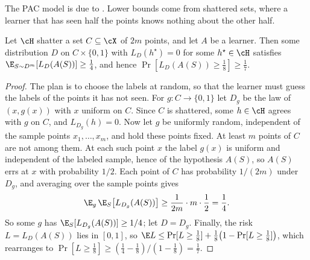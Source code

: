 \begin{refsection}

The PAC model is due to \textcite{Valiant1984}. Lower bounds come from shattered sets, where a learner that has seen half the points knows nothing about the other half.

\begin{theorem}\label{thm:vc:nfl}
Let $\cH$ shatter a set $C\subseteq\cX$ of $2m$ points, and let $A$ be a learner. Then some distribution $D$ on $C\times\{0,1\}$ with $L_D(h^\star) = 0$ for some $h^\star\in\cH$ satisfies $\E_{S\sim D^m}[L_D(A(S))]\ge\frac14$, and hence $\Pr[L_D(A(S))\ge\frac18]\ge\frac17$.
\end{theorem}

\begin{proof}
The plan is to choose the labels at random, so that the learner must guess the labels of the points it has not seen. For $g\colon C\to\{0,1\}$ let $D_g$ be the law of $(x,g(x))$ with $x$ uniform on $C$. Since $C$ is shattered, some $h\in\cH$ agrees with $g$ on $C$, and $L_{D_g}(h) = 0$. Now let $g$ be uniformly random, independent of the sample points $x_1,\dots,x_m$, and hold these points fixed. At least $m$ points of $C$ are not among them. At each such point $x$ the label $g(x)$ is uniform and independent of the labeled sample, hence of the hypothesis $A(S)$, so $A(S)$ errs at $x$ with probability $1/2$. Each point of $C$ has probability $1/(2m)$ under $D_g$, and averaging over the sample points gives
\[
  \E_g\,\E_S\big[L_{D_g}(A(S))\big]\ge\frac1{2m}\cdot m\cdot\frac12 = \frac14 .
\]
So some $g$ has $\E_S[L_{D_g}(A(S))]\ge1/4$; let $D = D_g$. Finally, the risk $L = L_D(A(S))$ lies in $[0,1]$, so $\E L\le\Pr[L\ge\frac18]+\frac18\big(1-\Pr[L\ge\frac18]\big)$, which rearranges to $\Pr[L\ge\frac18]\ge(\frac14-\frac18)/(1-\frac18) = \frac17$.
\end{proof}



\end{refsection}
